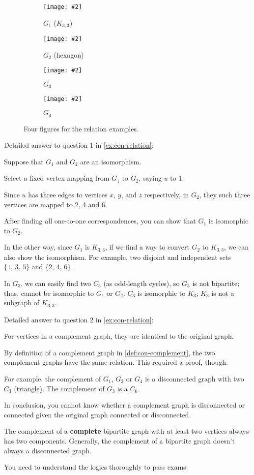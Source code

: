 \documentclass[../src/handouts/main.tex]{subfiles}
\begin{document}
\begin{figure}[htbp]
  \newcommand\quartersubfigure[4][width=.8\textwidth]{%
    \begin{subfigure}[t]{.2\textwidth}%
      \centering%
      \texttt{[image: \#2]}%
      \caption{#3}%
      \label{#4}%
    \end{subfigure}%
  }%
  \centering
  \quartersubfigure[width=.6\textwidth]{con-relation-g1}{$G_1$ ($K_{3,3}$)}{fig:con-relation-g1}
  \quartersubfigure{con-relation-g2}{$G_2$ (hexagon)}{fig:con-relation-g2}
  \quartersubfigure{con-relation-g3}{$G_3$}{fig:con-relation-g3}
  \quartersubfigure{con-relation-g4}{$G_4$}{fig:con-relation-g4}
  \caption{Four figures for the relation examples.}
  \label{fig:con-relation}
\end{figure}

Detailed answer to question 1 in \cref{ex:con-relation}:
\begin{enumerate*}
  \item Suppose that $G_1$ and $G_2$ are an isomorphism.
  \item Select a fixed vertex mapping from $G_1$ to $G_2$, saying $u$ to 1.
  \item Since $u$ has three edges to vertices $x$, $y$, and $z$ respectively, in $G_2$, they such three vertices are mapped to 2, 4 and 6.
  \item After finding all one-to-one correspondences, you can show that $G_1$ is isomorphic to $G_2$.
  \item In the other way, since $G_1$ is $K_{3,3}$, if we find a way to convert $G_2$ to $K_{3,3}$, we can also show the isomorphism. For example, two disjoint and independent sets $\{ 1,\, 3,\, 5 \}$ and $\{ 2,\, 4,\, 6 \}$.
  \item In $G_3$, we can easily find two $C_3$ (as odd-length cycles), so $G_3$ is not bipartite; thus, cannot be isomorphic to $G_1$ or $G_2$. $C_3$ is isomorphic to $K_3$; $K_3$ is not a subgraph of $K_{3,3}$.
\end{enumerate*}

Detailed answer to question 2 in \cref{ex:con-relation}:
\begin{enumerate*}
  \item For vertices in a complement graph, they are identical to the original graph.
  \item By definition of a complement graph in \cref{def:con-complement}, the two complement graphs have the same relation. This required a proof, though.
  \item For example, the complement of $G_1$, $G_2$ or $G_4$ is a disconnected graph with two $C_3$ (triangle). The complement of $G_3$ is a $C_6$.
  \item In conclusion, you cannot know whether a complement graph is disconnected or connected given the original graph connected or disconnected.
  \item The complement of a \textbf{complete} bipartite graph with at least two vertices always has two components. Generally, the complement of a bipartite graph doesn't always a disconnected graph.
  \item You need to understand the logics thoroughly to pass exams.
\end{enumerate*}
\end{document}
